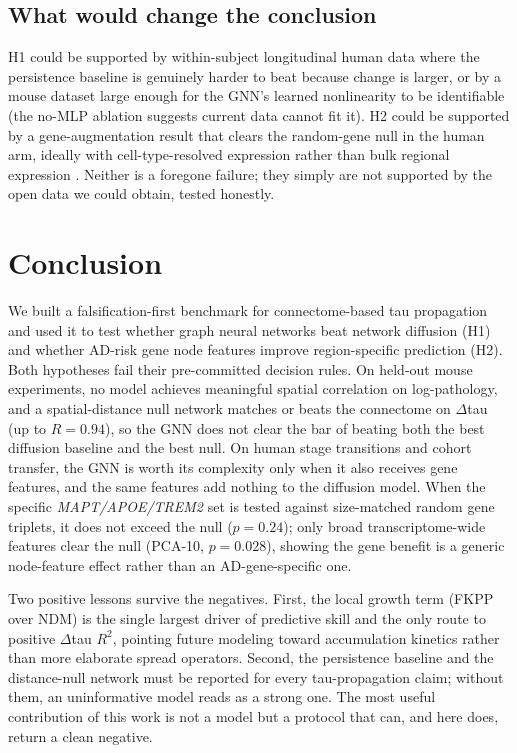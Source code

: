 \documentclass{article}
\begin{document}
\subsection{What would change the conclusion}

H1 could be supported by within-subject longitudinal human data where the persistence baseline is genuinely harder to beat because change is larger, or by a mouse dataset large enough for the GNN's learned nonlinearity to be identifiable (the no-MLP ablation suggests current data cannot fit it). H2 could be supported by a gene-augmentation result that clears the random-gene null in the human arm, ideally with cell-type-resolved expression rather than bulk regional expression \cite{zheng2019}. Neither is a foregone failure; they simply are not supported by the open data we could obtain, tested honestly.

\section{Conclusion}

We built a falsification-first benchmark for connectome-based tau propagation and used it to test whether graph neural networks beat network diffusion (H1) and whether AD-risk gene node features improve region-specific prediction (H2). Both hypotheses fail their pre-committed decision rules. On held-out mouse experiments, no model achieves meaningful spatial correlation on log-pathology, and a spatial-distance null network matches or beats the connectome on $\Delta$tau (up to $R = 0.94$), so the GNN does not clear the bar of beating both the best diffusion baseline and the best null. On human stage transitions and cohort transfer, the GNN is worth its complexity only when it also receives gene features, and the same features add nothing to the diffusion model. When the specific \textit{MAPT/APOE/TREM2} set is tested against size-matched random gene triplets, it does not exceed the null ($p = 0.24$); only broad transcriptome-wide features clear the null (PCA-10, $p = 0.028$), showing the gene benefit is a generic node-feature effect rather than an AD-gene-specific one.

Two positive lessons survive the negatives. First, the local growth term (FKPP over NDM) is the single largest driver of predictive skill and the only route to positive $\Delta$tau $R^2$, pointing future modeling toward accumulation kinetics rather than more elaborate spread operators. Second, the persistence baseline and the distance-null network must be reported for every tau-propagation claim; without them, an uninformative model reads as a strong one. The most useful contribution of this work is not a model but a protocol that can, and here does, return a clean negative.
\end{document}
